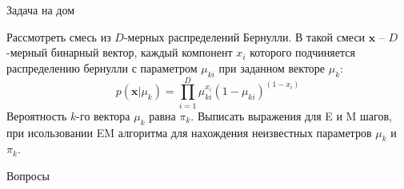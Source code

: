 \documentclass[10pt]{beamer}
\begin{document}
\begin{frame}{Задача на дом}

Рассмотреть смесь из $D$-мерных распределений Бернулли. В такой смеси $\mathbf{x}$ -- $D$-мерный бинарный вектор, каждый компонент $x_i$ которого подчиняется распределению бернулли с параметром $\mu_{ki}$ при заданном векторе $\mu_k$:
\[
p(\mathbf{x} | \mu_k) = \prod_{i=1}^D \mu_{ki}^{x_i} (1-\mu_{ki})^{(1-x_i)}
\]
Вероятность $k$-го вектора $\mu_k$ равна $\pi_k$. Выписать выражения для E и M шагов, при исользовании EM алгоритма для нахождения неизвестных параметров $\mu_k$ и $\pi_k$.

\end{frame}

\begin{frame}[plain]
\begin{center}
{\Large Вопросы}
\end{center}
\end{frame}
\end{document}
